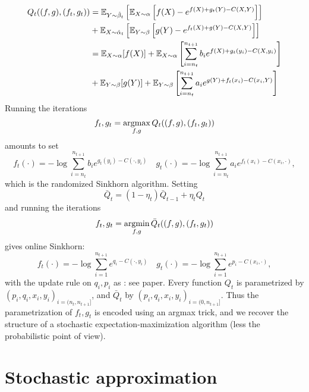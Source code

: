 \documentclass[a4paper, 10pt]{article}
\begin{document}
\begin{align}
    Q_t((f, g), (f_t, g_t)) &= \mathbb{E}_{Y \sim \hat \beta_t} \left[ \mathbb{E}_{X \sim \alpha} \left[
        f(X) - e^{f(X) + g_t(Y) - C(X, Y)} \right] \right] \\
        &+
        \mathbb{E}_{X \sim \hat \alpha_t} \left[ \mathbb{E}_{Y \sim \beta} \left[
        g(Y) - e^{f_t(X) + g(Y) - C(X, Y)} \right] \right] \\
        &= \mathbb{E}_{X \sim \alpha} [f(X)] + \mathbb{E}_{X \sim \alpha} \left[ \sum_{i=n_t}^{n_{t+1}} 
        b_i e^{f(X) + g_t(y_i) - C(X, y_i)} \right] \\
        &+ \mathbb{E}_{Y \sim \beta} [g(Y)] + \mathbb{E}_{Y \sim \beta} \left[ \sum_{i=n_t}^{n_{t+1}} 
        a_i e^{g(Y) + f_t(x_i) - C(x_i, Y)} \right]
\end{align}
Running the iterations
\begin{equation}
    f_t, g_t = \operatorname*{argmax}_{f,g} Q_t((f, g), (f_t, g_t))
\end{equation}
amounts to set
\begin{equation}
    f_t(\cdot) = - \log \sum_{i=n_t}^{n_{t+1}} b_i e^{g_t(y_i) - C(\cdot, y_i)} \quad
    g_t(\cdot) = - \log \sum_{i=n_t}^{n_{t+1}} a_i e^{f_t(x_i) - C(x_i, \cdot)},
\end{equation}
which is the randomized Sinkhorn algorithm. Setting
\begin{equation}
    \bar Q_t = (1 - \eta_t) \bar Q_{t-1} + \eta_t Q_{t}
\end{equation}
and running the iterations
\begin{equation}
    f_t, g_t = \operatorname*{argmin}_{f,g} \bar Q_t((f, g), (f_t, g_t))
\end{equation}
gives online Sinkhorn:
\begin{equation}
    f_t(\cdot) = - \log \sum_{i=1}^{n_{t+1}} e^{q_i - C(\cdot, y_i)} \quad
    g_t(\cdot) = - \log \sum_{i=1}^{n_{t+1}} e^{p_i - C(x_i, \cdot)},
\end{equation}
with the update rule on $q_i, p_i$ as : see paper.
Every function $Q_t$ is parametrized by $(p_i, q_i, x_i, y_i)_{i=(n_t,
 n_{t+1}]}$, and $\bar Q_t$ by $(p_i, q_i, x_i, y_i)_{i=(0, n_{t+1}]}$. Thus the
 parametrization of $f_t, g_t$ is encoded using an argmax trick, and we recover the structure of a stochastic expectation-maximization algorithm (less the probabilistic point of view).

 \section{Stochastic approximation}
\end{document}
